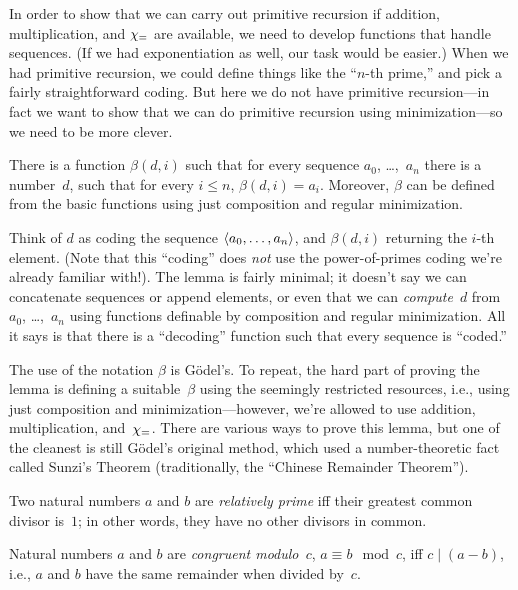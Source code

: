 \documentclass[../../../include/open-logic-section]{subfiles}
\begin{document}


In order to show that we can carry out primitive recursion if
addition, multiplication, and $\chi_{=}$ are available, we need to
develop functions that handle sequences. (If we had exponentiation as
well, our task would be easier.) When we had primitive recursion, we
could define things like the ``$n$-th prime,'' and pick a fairly
straightforward coding. But here we do not have primitive
recursion---in fact we want to show that we can do primitive recursion
using minimization---so we need to be more clever.  

\begin{lem}
There is a function $\beta(d,i)$ such that for every sequence $a_0$,
\dots,~$a_n$ there is a number~$d$, such that for every $i \le n$,
$\beta(d,i) = a_i$. Moreover, $\beta$ can be defined from the basic
functions using just composition and regular minimization.
\end{lem}

Think of $d$ as coding the sequence $\langle a_0, \dots, a_n \rangle$, and
$\beta(d,i)$ returning the $i$-th element. (Note that this ``coding''
does \emph{not} use the power-of-primes coding we're already familiar
with!). The lemma is fairly minimal; it doesn't say we can concatenate
sequences or append elements, or even that we can \emph{compute}~$d$
from $a_0$, \dots,~$a_n$ using functions definable by composition and
regular minimization. All it says is that there is a ``decoding''
function such that every sequence is ``coded.''

The use of the notation $\beta$ is G\"odel's. To repeat, the hard part
of proving the lemma is defining a suitable~$\beta$ using the
seemingly restricted resources, i.e., using just composition and
minimization---however, we're allowed to use addition, multiplication,
and~$\chi_{=}$. There are various ways to prove this lemma, but one of
the cleanest is still G\"odel's original method, which used a
number-theoretic fact called Sunzi's Theorem (traditionally, the ``Chinese Remainder Theorem'').

\begin{defn}
Two natural numbers $a$ and $b$ are \emph{relatively prime} iff their
greatest common divisor is~$1$; in other words, they have no other
divisors in common.
\end{defn}

\begin{defn}
Natural numbers $a$ and $b$ are \emph{congruent modulo~$c$}, $a \equiv b \mod c$, iff $c \mid (a-b)$, i.e., $a$ and $b$ have the
same remainder when divided by~$c$.
\end{defn}
\end{document}
